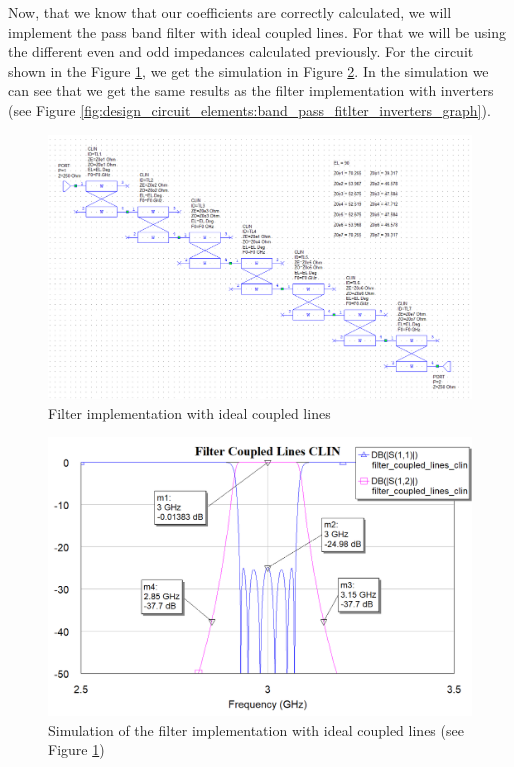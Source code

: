 \documentclass[12pt]{report} %
\begin{document}
Now, that we know that our coefficients are correctly calculated, we will implement the pass band filter with ideal coupled lines. For that we will be using the different even and odd impedances calculated previously. For the circuit shown in the Figure \ref{fig:design_circuit_elements:band_pass_filter_coupled_lines_ideal_circuit}, we get the simulation in Figure \ref{fig:design_circuit_elements:band_pass_filter_coupled_lines_ideal_graph}. In the simulation we can see that we get the same results as the filter implementation with inverters (see Figure \ref{fig:design_circuit_elements:band_pass_fitlter_inverters_graph}).

\begin{figure}[htbp]
    \centering
    \includegraphics[width=1\linewidth]{images//design_circuit_elements/band_pass_filter_coupled_lines_ideal_circuit.png}
    \caption{Filter implementation with ideal coupled lines}
    \label{fig:design_circuit_elements:band_pass_filter_coupled_lines_ideal_circuit}
\end{figure}

\begin{figure}[htbp]
    \centering
    \includegraphics[width=1\linewidth]{images//design_circuit_elements/band_pass_filter_coupled_lines_ideal_graph.png}
    \caption{Simulation of the filter implementation with ideal coupled lines (see Figure \ref{fig:design_circuit_elements:band_pass_filter_coupled_lines_ideal_circuit})}
    \label{fig:design_circuit_elements:band_pass_filter_coupled_lines_ideal_graph}
\end{figure}
\end{document}
